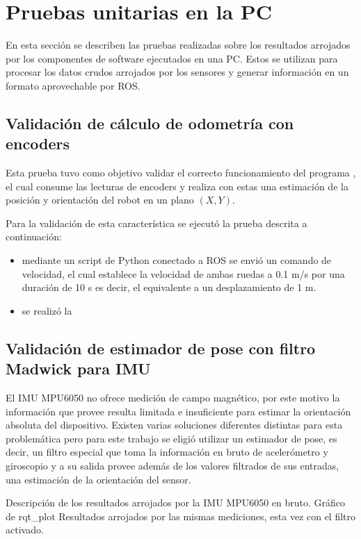 \section{Pruebas unitarias en la PC}

En esta sección se describen las pruebas realizadas sobre los resultados arrojados por los componentes de software ejecutados en una PC. Estos se utilizan para procesar los datos crudos arrojados por los sensores y generar información en un formato aprovechable por ROS.

\subsection{Validación de cálculo de odometría con encoders}

Esta prueba tuvo como objetivo validar el correcto funcionamiento del programa , el cual consume las lecturas de encoders y realiza con estas una estimación de la posición y orientación del robot en un plano $(X,Y)$.

Para la validación de esta característica se ejecutó la prueba descrita a continuación:

\begin{itemize}
    \item mediante un script de Python conectado a ROS se envió un comando de velocidad, el cual establece la velocidad de ambas ruedas a 0.1 m/s por una duración de 10 s es decir, el equivalente a un desplazamiento de 1 m.
    \item se realizó la
\end{itemize}

\subsection{Validación de estimador de pose con filtro Madwick para IMU}

El IMU MPU6050 no ofrece medición de campo magnético, por este motivo la información que provee resulta limitada e insuficiente para estimar la orientación absoluta del dispositivo.
Existen varias soluciones diferentes distintas para esta problemática pero para este trabajo se eligió utilizar un estimador de pose, es decir, un filtro especial que toma la información en bruto de acelerómetro y giroscopio y a su salida provee además de los valores filtrados de sus entradas, una estimación de la orientación del sensor.

Descripción de los resultados arrojados por la IMU MPU6050 en bruto. Gráfico de rqt\_plot
Resultados arrojados por las mismas mediciones, esta vez con el filtro activado.

